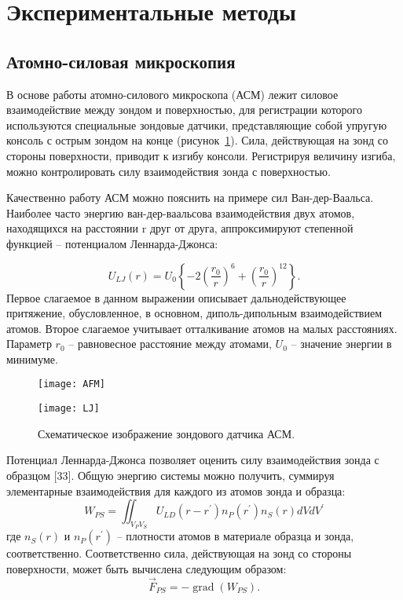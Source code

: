 \section{Экспериментальные методы}

\subsection{Атомно-силовая микроскопия}

В основе работы атомно-силового микроскопа (АСМ) лежит силовое взаимодействие между зондом и поверхностью, для регистрации которого используются специальные зондовые датчики, представляющие собой упругую консоль с острым зондом на конце (рисунок~\ref{fig:AFM}). Сила, действующая на зонд со стороны поверхности, приводит к изгибу консоли. Регистрируя величину изгиба, можно контролировать силу взаимодействия зонда с поверхностью.

Качественно работу АСМ можно пояснить на примере сил Ван-дер-Ваальса. Наиболее часто энергию ван-дер-ваальсова взаимодействия двух атомов, находящихся на расстоянии r друг от друга, аппроксимируют степенной функцией -- потенциалом Леннарда-Джонса:

\begin{equation}
	U_{LJ}(r)=U_0\left\{-2\left(\frac{r_0}{r}\right)^6+\left(\frac{r_0}{r}\right)^{12}\right\}.
\end{equation}
Первое слагаемое в данном выражении описывает дальнодействующее притяжение, обусловленное, в основном, диполь-дипольным взаимодействием атомов. Второе слагаемое учитывает отталкивание атомов на малых расстояниях. Параметр $r_0$ -- равновесное расстояние между атомами, $U_0$ -- значение энергии в минимуме.

\begin{figure}
	\centering
	\begin{minipage}{0.48\textwidth}
		\texttt{[image: AFM]}
	\end{minipage}
	\begin{minipage}{0.48\textwidth}
		\texttt{[image: LJ]}
	\end{minipage}
	\caption{Схематическое изображение зондового датчика АСМ.}
	\label{fig:AFM}
\end{figure}

Потенциал Леннарда-Джонса позволяет оценить силу взаимодействия зонда с образцом [33]. Общую энергию системы можно получить, суммируя элементарные взаимодействия для каждого из атомов зонда и образца:
\begin{equation}
	W_{P S}=\iint_{V_P V_S} U_{L D}\left(r-r^{\prime}\right) n_P\left(r^{\prime}\right) n_S(r) d V d V^{\prime}
\end{equation}
где $n_S(r)$ и $n_P(r^\prime)$ -- плотности атомов в материале образца и зонда, соответственно. Соответственно сила, действующая на зонд со стороны поверхности, может быть вычислена следующим образом:
\begin{equation}
	\vec{F}_{P S}=-\operatorname{grad}\left(W_{P S}\right).
\end{equation}

